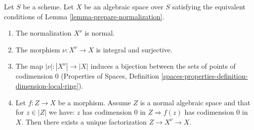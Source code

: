 \begin{lemma}
\label{lemma-normalization-normal}
Let $S$ be a scheme. Let $X$ be an algebraic space over $S$ satisfying the
equivalent conditions of Lemma \ref{lemma-prepare-normalization}.
\begin{enumerate}
\item The normalization $X^\nu$ is normal.
\item The morphism $\nu : X^\nu \to X$ is integral and surjective.
\item The map $|\nu| : |X^\nu| \to |X|$ induces a bijection between
the sets of points of codimension $0$ (Properties of Spaces,
Definition \ref{spaces-properties-definition-dimension-local-ring}).
\item Let $f : Z \to X$ be a morphism. Assume $Z$ is a normal algebraic space
and that for $z \in |Z|$ we have: $z$ has codimension $0$ in
$Z \Rightarrow f(z)$ has codimension $0$ in $X$. Then
there exists a unique factorization $Z \to X^\nu \to X$.
\end{enumerate}
\end{lemma}

